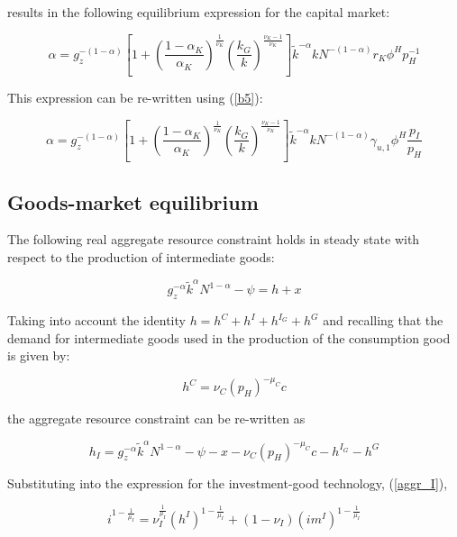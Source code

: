 \documentclass[a4paper,11pt]{article}
\numberwithin{equation}{section}
\begin{document}
	results in the following equilibrium expression for the capital market:
	
	\begin{equation}
	\alpha=g_z^{-(1-\alpha)}\left[1+\left(\frac{1-\alpha_K}{\alpha_K}\right)^{\frac{1}{\nu_K}}\left(\frac{k_G}{k}\right)^{\frac{\nu_K-1}{\nu_K}}\right]\tilde{k}^{-\alpha}kN^{-(1-\alpha)}r_K\phi^Hp_H^{-1}
	\end{equation}
	
	This expression can be re-written using (\ref{b5}):
	
	\begin{equation} \label{ss_capital}
	\alpha=g_z^{-(1-\alpha)}\left[1+\left(\frac{1-\alpha_K}{\alpha_K}\right)^{\frac{1}{\nu_K}}\left(\frac{k_G}{k}\right)^{\frac{\nu_K-1}{\nu_K}}\right]\tilde{k}^{-\alpha}kN^{-(1-\alpha)}\gamma_{u,1}\phi^H\frac{p_I}{p_H}
	\end{equation}
	
	\subsection{Goods-market equilibrium}
	
	The following real aggregate resource constraint holds in steady state with respect to the production of intermediate goods:
	
	\begin{equation}
	g_z^{-\alpha}\tilde{k}^{\alpha}N^{1-\alpha}-\psi=h+x
	\end{equation}
	
	Taking into account the identity $h=h^C+h^I+h^{I_G}+h^G$ and recalling that the demand for intermediate goods used in the production of the consumption good is given by:
	
	\begin{equation}
	h^C=\nu_C\left(p_H\right)^{-\mu_C}c
	\end{equation}
	
	the aggregate resource constraint can be re-written as
	
	\begin{equation} \label{b23}
	h_I=g_z^{-\alpha}\tilde{k}^{\alpha}N^{1-\alpha}-\psi-x-\nu_C\left(p_H\right)^{-\mu_C}c-h^{I_G}-h^G
	\end{equation}
	
	Substituting into the expression for the investment-good technology, (\ref{aggr_I}),
	
	\begin{equation}
	i^{1-\frac{1}{\mu_I}}=\nu_I^{\frac{1}{\mu_I}}\left(h^I\right)^{1-\frac{1}{\mu_I}}+\left(1-\nu_I\right)\left(im^I\right)^{1-\frac{1}{\mu_I}}
	\end{equation}
	
\end{document}
